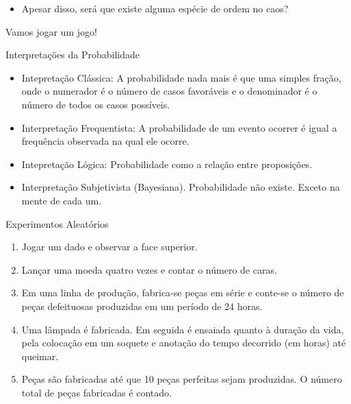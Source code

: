 \begin{frame}
    \begin{itemize}
        \item Apesar disso, será que existe alguma espécie de ordem no caos?
    \end{itemize}

    Vamos jogar um jogo!
\end{frame}

\begin{frame}{Interpretações da Probabilidade}
   \begin{itemize}
    \item Intepretação Clássica: A probabilidade nada mais é que uma simples fração, onde o numerador é o número de casos favoráveis e o denominador é o número de todos os casos possíveis.
    \item Interpretação Frequentista: A probabilidade de um evento ocorrer é igual a frequência observada na qual ele ocorre. 
    \item Intepretação Lógica: Probabilidade como a relação entre proposições. 
    \item Interpretação Subjetivista (Bayesiana). Probabilidade não existe. \pause Exceto na mente de cada um.  
   \end{itemize} 
\end{frame}


\begin{frame}{Experimentos Aleatórios}

\begin{exemplo}
    \begin{enumerate}
        \item Jogar um dado e observar a face superior.
        \item Lançar uma moeda quatro vezes e contar o número de caras.
        \item Em uma linha de produção, fabrica-se peças em série e conte-se o número de peças defeituosas produzidas em um período de 24 horas.
        \item Uma lâmpada é fabricada. Em seguida é ensaiada quanto à duração da vida, pela colocação em um soquete e anotação do tempo decorrido (em horas) até queimar.
        \item Peças são fabricadas até que 10 peças perfeitas sejam produzidas. O número total de peças fabricadas é contado.
    \end{enumerate}
\end{exemplo}
\end{frame}

